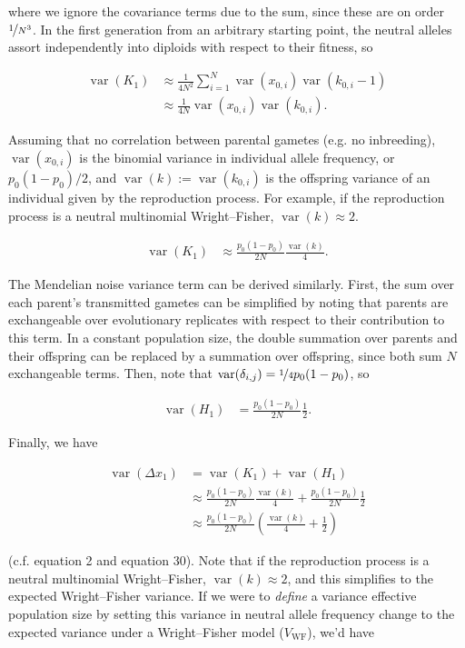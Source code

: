 \documentclass[11pt]{article}
\DeclareMathOperator{\var}{var}
\begin{document}
where we ignore the covariance terms due to the sum, since these are on order
$\nicefrac{1}{N^3}$. In the first generation from an arbitrary starting point,
the neutral alleles assort independently into diploids with respect to their
fitness, so

\begin{align}
  \var(K_1) &\approx \frac{1}{4N^2} \sum_{i=1}^N \var(x_{0,i}) \var(k_{0,i} - 1)  \\
            &\approx \frac{1}{4N} \var(x_{0,i}) \var(k_{0,i}).
\end{align}

Assuming that no correlation between parental gametes (e.g. no inbreeding),
$\var(x_{0,i})$ is the binomial variance in individual allele frequency, or
$p_0(1-p_0)/2$, and $\var(k) := \var(k_{0,i})$ is the offspring variance of an
individual given by the reproduction process. For example, if the reproduction
process is a neutral multinomial Wright--Fisher, $\var(k) \approx 2$.

\begin{align}
  \var(K_1) &\approx \frac{p_0(1-p_0)}{2N} \frac{\var(k)}{4}.
\end{align}

The Mendelian noise variance term can be derived similarly. First, the sum over
each parent's transmitted gametes can be simplified by noting that parents are
exchangeable over evolutionary replicates with respect to their contribution to
this term. In a constant population size, the double summation over parents and
their offspring can be replaced by a summation over offspring, since both sum
$N$ exchangeable terms. Then, note that $\var(\delta_{i,j}) = \nicefrac{1}{4}
p_0(1-p_0)$, so

\begin{align}
  \var(H_1) &= \frac{p_0(1-p_0)}{2N} \frac{1}{2}.
\end{align}

Finally, we have

\begin{align}
  \var(\Delta x_1) &= \var(K_1) + \var(H_1) \\
  &\approx \frac{p_0(1-p_0)}{2N} \frac{\var(k)}{4} + \frac{p_0(1-p_0)}{2N} \frac{1}{2} \\
                   &\approx \frac{p_0(1-p_0)}{2N}\left(\frac{\var(k)}{4} + \frac{1}{2}\right)
\end{align}

(c.f. \cite{Santiago1995-hx} equation 2 and \cite{Buffalo2019-qs} equation 30).
Note that if the reproduction process is a neutral multinomial Wright--Fisher,
$\var(k) \approx 2$, and this simplifies to the expected Wright--Fisher
variance. If we were to \emph{define} a variance effective population size by
setting this variance in neutral allele frequency change to the expected
variance under a Wright--Fisher model ($V_\text{WF}$), we'd have
\end{document}
